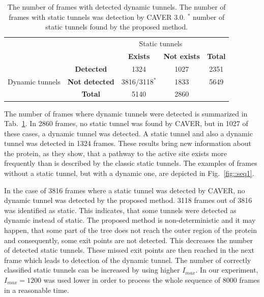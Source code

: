 \documentclass[usletter, 10pt, conference]{svjour3}      %
\def\Imax{I_{max}} %
\begin{document}
\begin{table}
\centering
\caption{\label{tab::dyn} The number of frames with detected dynamic tunnels. The number of frames
    with static tunnels was detection by CAVER 3.0. $^{*}$ number of static tunnels found by the proposed method.
}
\begin{tabular}{ccccc}
\toprule
                              &   &  \multicolumn{2}{c}{ Static tunnels}   \\
                              &    &  {\bf Exists} & {\bf Not exists} & {\bf Total } \\
\midrule                                     
\multirow{3}{*}{Dynamic tunnels} & {\bf Detected} & 1324 & 1027 & 2351 \\
                                 & {\bf Not detected} & 3816/3118$^*$ & 1833 & 5649 \\
                                 & {\bf Total }       &  5140 & 2860 \\
\bottomrule                                 
\end{tabular}
\end{table}





The number of frames where dynamic tunnels were detected is summarized in Tab.~\ref{tab::dyn}.
In 2860 frames, no static tunnel was found by CAVER, but  in 1027 of these cases, a dynamic tunnel was detected.
A static tunnel and also a dynamic tunnel was detected in 1324 frames.
These results bring new information about the protein, as they show, that a pathway to the active site exists more
frequently than is described by the classic static tunnels.
The examples of frames without a static tunnel, but with a dynamic one, are depicted in Fig.~\ref{fig::seq1}.


In the case of 3816 frames where a static tunnel was detected by CAVER, no dynamic tunnel was detected by the proposed method. 
3118 frames out of 3816 was identified as static.
This indicates, that some tunnels were detected as dynamic instead of static.
The proposed method is non-deterministic and it may happen, that some part of the tree does not
reach the outer region of the protein and consequently, some exit points are not detected.
This decreases the number of detected static tunnels.
These missed exit points are then reached in the next frame which leads to detection of the dynamic tunnel.
The number of correctly classified static tunnels can be increased by using higher $\Imax$.
In our experiment, $\Imax=1200$ was used lower in order to process the whole sequence of 8000 frames in a reasonable time.
\end{document}
